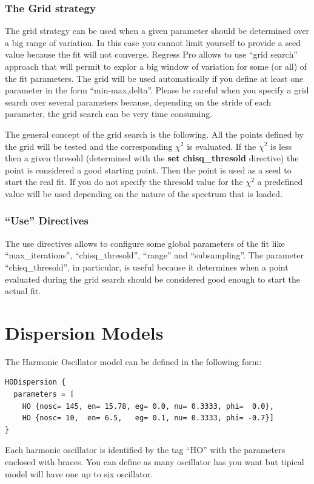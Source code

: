 \documentclass[a4paper]{report}
\begin{document}
\subsection{The Grid strategy}
The grid strategy can be used when a given parameter should be
determined over a big range of variation. In this case you cannot
limit yourself to provide a seed value because the fit will not
converge. Regress Pro allows to use ``grid search'' approach that will
permit to explor a big window of variation for some (or all) of the
fit parameters. The grid will be used automatically if you define at
least one parameter in the form ``min-max,delta''. Please be careful
when you specify a grid search over several parameters because,
depending on the stride of each parameter, the grid search can be very
time consuming.

The general concept of the grid search is the following. All the
points defined by the grid will be tested and the corresponding
$\chi^2$ is evaluated. If the $\chi^2$ is less then a given thresold
(determined with the \textbf{set chisq\_thresold} directive) the point
is considered a good starting point. Then the point is used as a seed
to start the real fit. If you do not specify the thresold value for
the $\chi^2$ a predefined value will be used depending on the nature
of the spectrum that is loaded.

\subsection{``Use'' Directives}
The use directives allows to configure some global parameters of the
fit like ``max\_iterations'', ``chisq\_thresold'', ``range'' and
``subsampling''. The parameter ``chisq\_thresold'', in particular, is
useful because it determines when a point evaluated during the grid
search should be considered good enough to start the actual fit.

\chapter{Dispersion Models}

The Harmonic Oscillator model can be defined in the following form:
\begin{verbatim}
HODispersion {
  parameters = [
    HO {nosc= 145, en= 15.78, eg= 0.0, nu= 0.3333, phi=  0.0},
    HO {nosc= 10,  en= 6.5,   eg= 0.1, nu= 0.3333, phi= -0.7}]
}
\end{verbatim}
Each harmonic oscillator is identified by the tag ``HO'' with the parameters enclosed with braces.
You can define as many oscillator has you want but tipical model will have one up to six oscillator.
\end{document}

